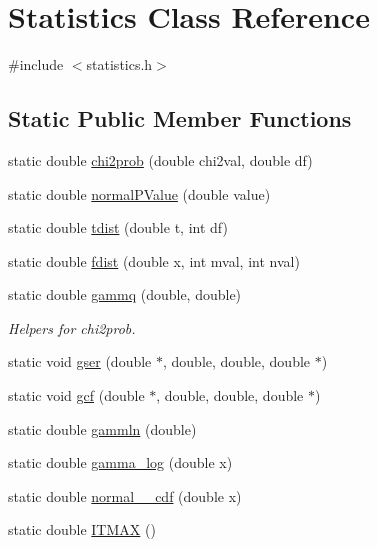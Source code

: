 \hypertarget{classStatistics}{
\section{Statistics Class Reference}
\label{classStatistics}
}


{\ttfamily \#include $<$statistics.h$>$}

\subsection*{Static Public Member Functions}
\begin{DoxyCompactItemize}
\item 
static double \hyperlink{classStatistics_a7577018477349241f3c5ae3760590aee}{chi2prob} (double chi2val, double df)
\item 
static double \hyperlink{classStatistics_a024e673ac44377b48a9744481d6edc96}{normalPValue} (double value)
\item 
static double \hyperlink{classStatistics_a16ece213e64bb53a786cb4171efe2290}{tdist} (double t, int df)
\item 
static double \hyperlink{classStatistics_a2b6ee0e84409d64cd26377258750c61b}{fdist} (double x, int mval, int nval)
\item 
static double \hyperlink{classStatistics_a2354707a932318f80943bd0a197f0055}{gammq} (double, double)
\begin{DoxyCompactList}\small\item\em Helpers for chi2prob. \item\end{DoxyCompactList}\item 
static void \hyperlink{classStatistics_a6f2de659aa389b60e2de44070f1fc467}{gser} (double $\ast$, double, double, double $\ast$)
\item 
static void \hyperlink{classStatistics_a7c05e92e684944e4e24adb04f64dfc74}{gcf} (double $\ast$, double, double, double $\ast$)
\item 
static double \hyperlink{classStatistics_ad1340b8f52570bb39f6fae2a565e4a90}{gammln} (double)
\item 
static double \hyperlink{classStatistics_a7802e672039a0e6d879333ed83bb53a4}{gamma\_\-log} (double x)
\item 
static double \hyperlink{classStatistics_a125d2cca3291146c2623f3fcc4a16b43}{normal\_\_\-cdf} (double x)
\item 
static double \hyperlink{classStatistics_af33851046a60580f5c9b75db34f444bf}{ITMAX} ()

\end{DoxyCompactItemize}
